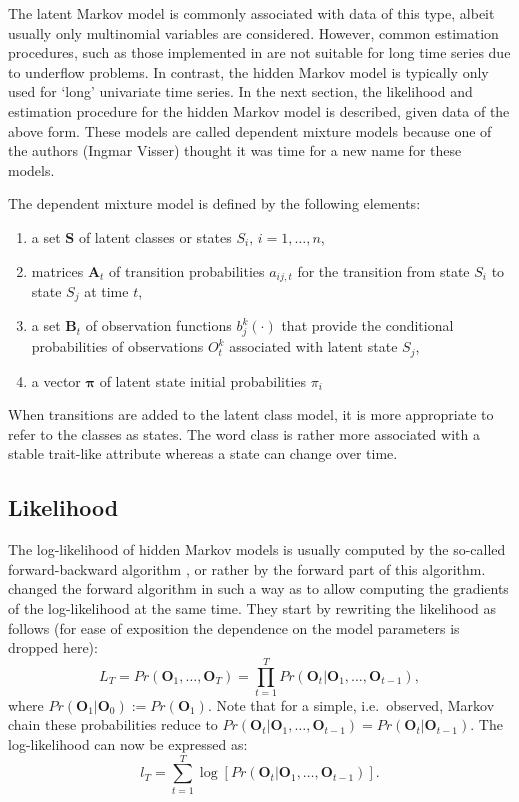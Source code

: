 \documentclass[a4paper]{article}
\newcommand{\vc}{\mathbf}
\newcommand{\mat}{\mathbf}
\begin{document}
The latent Markov model is commonly associated with data of this type,
albeit usually only multinomial variables are considered.  However,
common estimation procedures, such as those implemented in
\citet{Pol1996} are not suitable for long time series due to underflow
problems.  In contrast, the hidden Markov model is typically only used
for `long' univariate time series.  In the next section, the
likelihood and estimation procedure for the hidden Markov model is
described, given data of the above form.  These models are called
dependent mixture models because one of the authors (Ingmar Visser)
thought it was time for a new name for these models.

The dependent mixture model is defined by the following elements:
\begin{enumerate}
	
	\item a set $\vc{S}$ of latent classes or states $S_{i},\, i=1,
	\ldots , n$,
	
	\item matrices $\mat{A}_t$ of transition probabilities $a_{ij,t}$ for
	the transition from state $S_{i}$ to state $S_{j}$ at time $t$,
	
	\item a set $\vc{B}_t$ of observation functions $b_j^k(\cdot)$ that
	provide the conditional probabilities of observations $O_{t}^k$ 
	associated with latent state $S_{j}$,
	
	\item a vector $\pmb{\pi}$ of latent state initial probabilities
	$\pi_{i}$
\end{enumerate}
When transitions are added to the latent class model, it is more 
appropriate to refer to the classes as states. The word class is 
rather more associated with a stable trait-like attribute whereas a 
state can change over time. 


\subsection{Likelihood}

The log-likelihood of hidden Markov models is usually computed by the
so-called forward-backward algorithm \citep{Baum1966,Rabiner1989}, or
rather by the forward part of this algorithm.  \cite{Lystig2002}
changed the forward algorithm in such a way as to allow computing the
gradients of the log-likelihood at the same time.  They start by
rewriting the likelihood as follows (for ease of exposition the
dependence on the model parameters is dropped here):
\begin{equation}
	L_{T} = Pr(\vc{O}_{1}, \ldots, \vc{O}_{T}) = \prod_{t=1}^{T} 
Pr(\vc{O}_{t}|\vc{O}_{1}, 
	\ldots, \vc{O}_{t-1}), 
	\label{condLike}
\end{equation}
where $Pr(\vc{O}_{1}|\vc{O}_{0}):=Pr(\vc{O}_{1})$. Note that for a 
simple, i.e.\ observed, Markov chain these probabilities reduce to 
$Pr(\vc{O}_{t}|\vc{O}_{1},\ldots, 
\vc{O}_{t-1})=Pr(\vc{O}_{t}|\vc{O}_{t-1})$.
The log-likelihood can now be expressed as:
\begin{equation}
	l_{T} = \sum_{t=1}^{T} \log[Pr(\vc{O}_{t}|\vc{O}_{1}, \ldots, 
\vc{O}_{t-1})].
	\label{eq:condLogl}
\end{equation}
\end{document}
